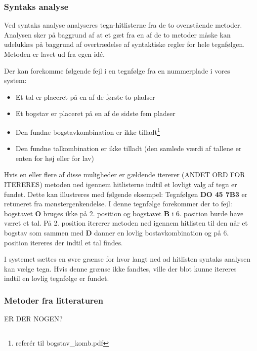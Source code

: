 \subsubsection{Syntaks analyse}

Ved syntaks analyse analyseres tegn-hitlisterne fra de to ovenstående metoder. Analysen sker på baggrund af at et gæt fra en af de to metoder måske kan udelukkes på baggrund af overtrædelse af syntaktiske regler for hele tegnfølgen. Metoden er lavet ud fra egen idé.

Der kan forekomme følgende fejl i en tegnfølge fra en nummerplade i vores system:

\begin{itemize}
\item Et tal er placeret på en af de første to pladser
\item Et bogstav er placeret på en af de sidste fem pladser
\item Den fundne bogstavkombination er ikke tilladt\footnote{referér til bogstav\_komb.pdf}
\item Den fundne talkombination er ikke tilladt (den samlede værdi af tallene er enten for høj eller for lav)
\end{itemize}

Hvis en eller flere af disse muligheder er gældende itererer (ANDET ORD FOR ITERERES) metoden ned igennem hitlisterne indtil et lovligt valg af tegn er fundet. Dette kan illustreres med følgende eksempel: Tegnfølgen \textbf{DO 45 7B3} er retuneret fra mønstergenkendelse. I denne tegnfølge forekommer der to fejl: bogstavet \textbf{O} bruges ikke på 2. position og bogstavet \textbf{B} i 6. position burde have været et tal. På 2. position itererer metoden ned igennem hitlisten til den når et bogstav som sammen med \textbf{D} danner en lovlig bostavkombination og på 6. position itereres der indtil et tal findes.

I systemet sættes en øvre grænse for hvor langt ned ad hitlisten syntaks analysen kan vælge tegn. Hvis denne grænse ikke fandtes, ville der blot kunne itereres indtil en lovlig tegnfølge er fundet.

\subsubsection{Metoder fra litteraturen}

ER DER NOGEN?
